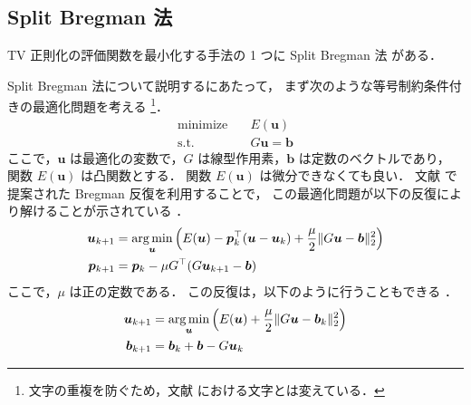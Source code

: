 \subsection{Split Bregman 法}

TV 正則化の評価関数を最小化する手法の 1 つに
Split Bregman 法 \cite{Goldstein2009}
がある．

Split Bregman 法について説明するにあたって，
まず次のような等号制約条件付きの最適化問題を考える
\cite{Goldstein2009}
\footnote{文字の重複を防ぐため，文献 \cite{Goldstein2009} における文字とは変えている．}．
\begin{align}
    \text{minimize} \hspace{1em} & E(\bm{u})         \\
    \text{s.t.} \hspace{1em}     & G \bm{u} = \bm{b}
\end{align}
ここで，$\bm{u}$ は最適化の変数で，$G$ は線型作用素，$\bm{b}$ は定数のベクトルであり，
関数 $E(\bm{u})$ は凸関数とする．
関数 $E(\bm{u})$ は微分できなくても良い．
文献 \cite{Bregman1967} で提案された Bregman 反復を利用することで，
この最適化問題が以下の反復により解けることが示されている
\cite{Goldstein2009}．
\begin{align}
    \bm{u}_{k+1} & = \operatorname*{arg \thinspace min}_{\bm{u}} \left( E(\bm{u}) - \bm{p}_k^\top (\bm{u} - \bm{u}_k)
    + \frac{\mu}{2} \|G \bm{u} - \bm{b}\|_2^2 \right)
    \\
    \bm{p}_{k+1} & = \bm{p}_k - \mu G^\top (G \bm{u}_{k+1} - \bm{b})
\end{align}
ここで，$\mu$ は正の定数である．
この反復は，以下のように行うこともできる
\cite{Goldstein2009}．
\begin{align}
    \bm{u}_{k+1} & = \operatorname*{arg \thinspace min}_{\bm{u}} \left( E(\bm{u}) + \frac{\mu}{2} \|G \bm{u} - \bm{b}_k\|_2^2 \right)
    \\
    \bm{b}_{k+1} & = \bm{b}_k + \bm{b} - G \bm{u}_k
\end{align}


